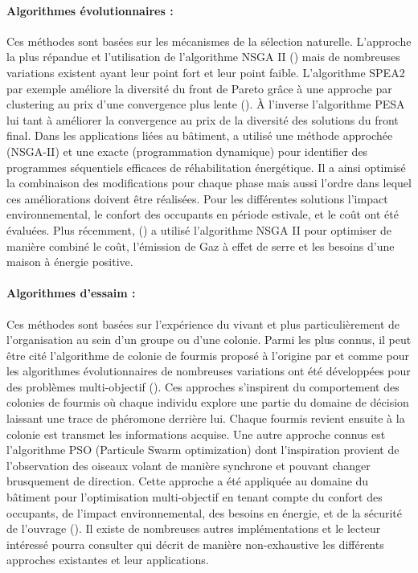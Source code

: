 \paragraph{Algorithmes évolutionnaires :} %
\label{par:algorithmes_évolutionnaires}
Ces méthodes sont basées sur les mécanismes de la sélection naturelle. L’approche la plus
répandue et l’utilisation de l’algorithme NSGA II (\cite{Deb2002182}) mais de nombreuses
variations existent ayant leur point fort et leur point faible. L’algorithme
SPEA2 par exemple améliore la diversité du front de Pareto grâce à une approche par
clustering au prix d’une convergence plus lente (\cite{Zitzler2001}). À l’inverse
l’algorithme PESA lui tant à améliorer la convergence au prix de la diversité des
solutions du front final. Dans les applications liées au bâtiment, \cite{Rivallain2013}
a utilisé une méthode approchée (NSGA-II) et une exacte (programmation dynamique)
pour identifier des programmes séquentiels efficaces de réhabilitation énergétique.
Il a ainsi optimisé la combinaison des modifications pour chaque phase mais aussi l’ordre
dans lequel ces améliorations doivent être réalisées.
Pour les différentes solutions l’impact environnemental, le confort des occupants en
période estivale, et le coût ont été évaluées.
Plus récemment, () a utilisé l’algorithme NSGA II pour
optimiser de manière combiné le coût, l’émission de Gaz à effet de serre et
les besoins d’une maison à énergie positive.

\paragraph{Algorithmes d’essaim :} %
\label{par:algorithmes_d_essaim}
Ces méthodes sont basées sur l’expérience du vivant et plus particulièrement de
l’organisation au sein d’un groupe ou d’une colonie. Parmi les plus connus, il peut être
cité l’algorithme de colonie de fourmis proposé à l’origine par \cite{Colorni1992509}
et comme pour les algorithmes évolutionnaires de nombreuses variations ont été développées
pour des problèmes multi-objectif (\cite{MichaelGuntsch2003,Shea2006627}).
Ces approches s’inspirent du comportement des colonies de fourmis où chaque individu
explore une partie du domaine de décision laissant une trace de phéromone derrière lui.
Chaque fourmis revient ensuite à la colonie est transmet les informations acquise.
Une autre approche connus est l’algorithme PSO (Particule Swarm optimization) dont
l’inspiration provient de l’observation des oiseaux volant de manière synchrone et
pouvant changer brusquement de direction. Cette approche a été appliquée au domaine
du bâtiment pour l’optimisation multi-objectif en tenant compte du confort des occupants,
de l’impact environnemental, des besoins en énergie, et de la sécurité de l’ouvrage (\cite{Armand-Decker2015}).
Il existe de nombreuses autres implémentations et le lecteur intéressé pourra consulter
\cite{Aboul-EllaHassanien2015} qui décrit de manière non-exhaustive les différents
approches existantes et leur applications.


